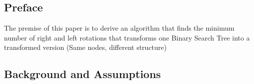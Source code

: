\documentclass{assignment}
\date{\today}
\begin{document}
\begin{problem}

\section*{Preface}

\noindent The premise of this paper is to derive an algorithm  that finds the minimum number of right and left rotations that transforms one Binary Search Tree into a transformed version (Same nodes, different structure)

\subsection*{Background and Assumptions} \\

\begin{center}
\end{center}


\end{problem}
\end{document}
